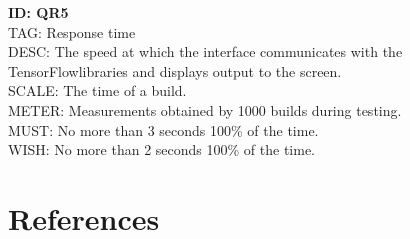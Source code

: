 \documentclass[journal,10pt,onecolumn,compsoc]{IEEEtran} \usepackage[margin=1.0in]{geometry} \usepackage{pdfpages} \usepackage{graphicx}
\begin{document}
\noindent
\textbf{ID: QR5}\\
TAG: Response time\\
DESC: The speed at which the interface communicates with the TensorFlow\texttrademark libraries and displays output to the screen.\\
SCALE: The time of a build.\\
METER: Measurements obtained by 1000 builds during testing.\\
MUST: No more than 3 seconds 100\% of the time.\\
WISH: No more than 2 seconds 100\% of the time.\\

\newpage


\newpage
\section{References}

\end{document}
